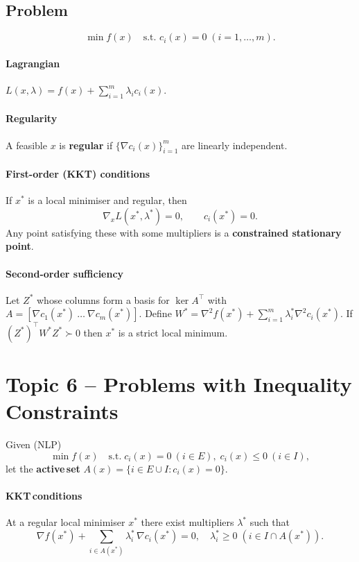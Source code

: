 \documentclass[12pt]{article}
\begin{document}
\subsection{Problem}
\[
\min f(x)\quad\text{s.t. } c_i(x)=0\;(i=1,\dots,m).
\]

\paragraph{Lagrangian}
\(L(x,\lambda)=f(x)+\sum_{i=1}^{m}\lambda_i c_i(x)\).

\paragraph{Regularity}
A feasible \(x\) is {\bf regular} if \(\{\nabla c_i(x)\}_{i=1}^m\) are linearly
independent.

\paragraph{First-order (KKT) conditions}
If \(x^\ast\) is a local minimiser and regular, then
\[
\nabla_x L(x^\ast,\lambda^\ast)=0,\qquad c_i(x^\ast)=0.
\]
Any point satisfying these with some multipliers is a
{\bf constrained stationary point}.

\paragraph{Second-order sufficiency}
Let \(Z^\ast\) whose columns form a basis for \(\ker A^\top\) with
\(A=[\nabla c_1(x^\ast)\ \dots\ \nabla c_m(x^\ast)]\).  Define
\(W^\ast=\nabla^2 f(x^\ast)+\sum_{i=1}^m \lambda_i^\ast\nabla^2c_i(x^\ast)\).
If \((Z^\ast)^\top W^\ast Z^\ast\succ0\) then \(x^\ast\) is a strict local
minimum.

\section{Topic 6 – Problems with Inequality Constraints}

Given (NLP)
\[
\min f(x)\quad
\text{s.t.}\;
c_i(x)=0\ (i\in E),\;
c_i(x)\le0\ (i\in I),
\]
let the {\bf active\,set}
\(A(x)=\{i\in E\cup I : c_i(x)=0\}\).

\paragraph{KKT\,conditions}
At a regular local minimiser \(x^\ast\) there exist multipliers
\(\lambda^\ast\) such that
\[
\nabla f(x^\ast)+\sum_{i\in A(x^\ast)}\lambda_i^\ast\,\nabla c_i(x^\ast)=0,
\quad
\lambda_i^\ast\ge0\;(i\in I\cap A(x^\ast)).
\]
\end{document}
